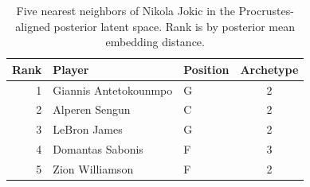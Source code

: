 \begin{table}[htbp]
  \centering\small
  \begin{tabular}{rllc}
    \toprule
    Rank & Player & Position & Archetype \\
    \midrule
    1 & Giannis Antetokounmpo & G & 2 \\
    2 & Alperen Sengun & C & 2 \\
    3 & LeBron James & G & 2 \\
    4 & Domantas Sabonis & F & 3 \\
    5 & Zion Williamson & F & 2 \\
    \bottomrule
  \end{tabular}
  \caption{Five nearest neighbors of Nikola Jokic in the Procrustes-aligned posterior latent space. Rank is by posterior mean embedding distance.}
  \label{tab:Nikola_Jokic_neighbors}
\end{table}

